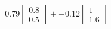 \documentclass[preview]{standalone}
\begin{document}
\begin{align*}
0.79 \begin{bmatrix} 0.8 \\ 0.5 \end{bmatrix} + -0.12 \begin{bmatrix} 1 \\ 1.6 \end{bmatrix}
\end{align*}
\end{document}
